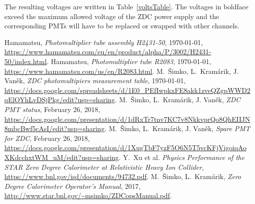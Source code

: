 \documentclass[a4paper,10pt]{article}
\begin{document}
The resulting voltages are written in Table~\ref{voltsTable}. The voltages in boldface exceed the maximum allowed voltage of the ZDC power supply and the corresponding PMTs will have to be replaced or swapped with other channels.





\begin{thebibliography}{10}
 Hamamatsu, \textit{Photomultiplier tube assembly H2431-50}, \today, \url{https://www.hamamatsu.com/eu/en/product/alpha/P/3002/H2431-50/index.html}.
 Hamamatsu, \textit{Photomultiplier tube R2083}, \today, \url{https://www.hamamatsu.com/us/en/R2083.html}.
 M.\ Šimko, L.\ Kramárik, J. Vaněk, \textit{ZDC photomultipiers measurement table}, \today,\\ \url{https://docs.google.com/spreadsheets/d/1E0_PEfIwpkxFE8akk1zveQZgpWWD2qElOYhLvDSjPkg/edit?usp=sharing}.
 M.\ Šimko, L.\ Kramárik, J. Vaněk, \textit{ZDC PMT status}, February 26, 2018,
 \url{https://docs.google.com/presentation/d/1dRxTr7tnv7KC7v8NkkvprQo8QhEIIJN8mbcBwf5cAsI/edit?usp=sharing}.
 M.\ Šimko, L.\ Kramárik, J. Vaněk, \textit{Spare PMT for ZDC}, February 26, 2018, \url{https://docs.google.com/presentation/d/1XugTbF7yzF5O6N5T5vcKFjVigoiqAoXKdcchxtWM_uM/edit?usp=sharing}.
 Y.\ Xu et al. \textit{Physics Performance of the STAR Zero Degree Calorimeter at Relativistic Heavy Ion Collider}, \url{https://www.bnl.gov/isd/documents/94732.pdf}.
 M.\ Šimko, L.\ Kramárik, \textit{Zero Degree Calorimeter Operator’s
Manual}, 2017, \url{http://www.star.bnl.gov/~msimko/ZDCopsManual.pdf}.
\end{thebibliography}
\end{document}
